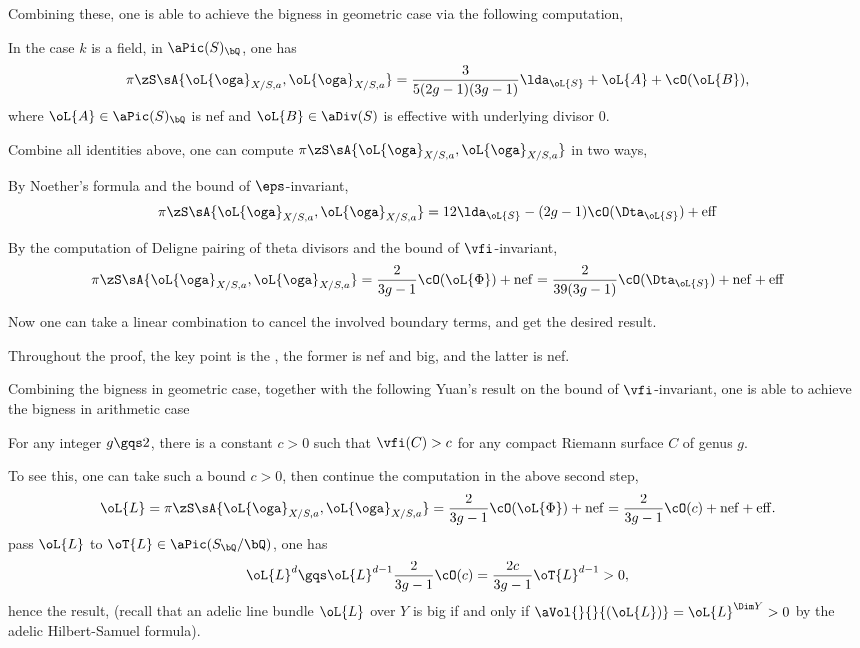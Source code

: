 \documentclass[article, a4paper, twoside]{universal}
\begin{document}
Combining these, one is able to achieve the bigness in geometric case via the following computation,
\begin{thm}
	In the case $k$ is a field, in $\aPic(S)_{\bQ}$, one has
	\[
		\pi\zS\sA{\oL{\oga}_{X/S,a},\oL{\oga}_{X/S,a}}=\frac{3}{5(2g-1)(3g-1)}\lda_{\oL{S}}+\oL{A}+\cO(\oL{B}),
	\]
	where $\oL{A}\in\aPic(S)_{\bQ}$ is nef and $\oL{B}\in\aDiv(S)$ is effective with underlying divisor $0$.
\end{thm}

\begin{prf}
	Combine all identities above, one can compute $\pi\zS\sA{\oL{\oga}_{X/S,a},\oL{\oga}_{X/S,a}}$ in two ways,
	\begin{enr}
		\item By Noether's formula and the bound of $\eps$-invariant,
		\[
			\pi\zS\sA{\oL{\oga}_{X/S,a},\oL{\oga}_{X/S,a}}=12\lda_{\oL{S}}-(2g-1)\cO(\Dta_{\oL{S}})+ \mathrm{eff}
		\]
		\item By the computation of Deligne pairing of theta divisors and the bound of $\vfi$-invariant,
		\[
			\pi\zS\sA{\oL{\oga}_{X/S,a},\oL{\oga}_{X/S,a}}=\frac{2}{3g-1}\cO(\oL{\Phi})+ \mathrm{nef}=\frac{2}{39(3g-1)}\cO(\Dta_{\oL{S}})+ \mathrm{nef} + \mathrm{eff}
		\]
	\end{enr}
	Now one can take a linear combination to cancel the involved boundary terms, and get the desired result.
\end{prf}

\begin{rmk}
	Throughout the proof, the key point is the , the former is nef and big, and the latter is nef.
\end{rmk}

Combining the bigness in geometric case, together with the following Yuan's result on the bound of $\vfi$-invariant, one is able to achieve the bigness in arithmetic case

\begin{thm}
	For any integer $g\gqs2$, there is a constant $c>0$ such that $\vfi(C)>c$ for any compact Riemann surface $C$ of genus $g$.
\end{thm}

To see this, one can take such a bound $c>0$, then continue the computation in the above second step,
\[
	\oL{L}=\pi\zS\sA{\oL{\oga}_{X/S,a},\oL{\oga}_{X/S,a}}=\frac{2}{3g-1}\cO(\oL{\Phi})+ \mathrm{nef}=\frac{2}{3g-1}\cO(c)+ \mathrm{nef}+ \mathrm{eff}.
\]
pass $\oL{L}$ to $\oT{L}\in\aPic(S_{\bQ}/\bQ)$, one has
\[
	\oL{L}^{d}\gqs\oL{L}^{d-1}\frac{2}{3g-1}\cO(c)=\frac{2c}{3g-1}\oT{L}^{d-1}>0,
\]
hence the result, (recall that an adelic line bundle $\oL{L}$ over $Y$ is big if and only if $\aVol{}{}{(\oL{L})}=\oL{L}^{\Dim Y}>0$ by the adelic Hilbert-Samuel formula).
\end{document}

